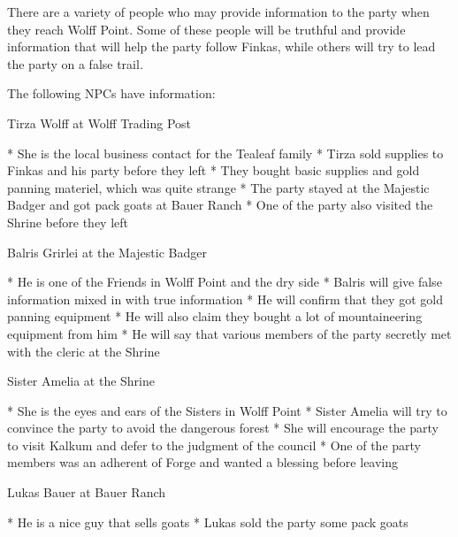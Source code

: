 There are a variety of people who may provide information to the party when they reach Wolff Point.
Some of these people will be truthful and provide information that will help the party follow Finkas, while others will try to lead the party on a false trail.

The following NPCs have information:

Tirza Wolff at Wolff Trading Post

* She is the local business contact for the Tealeaf family
* Tirza sold supplies to Finkas and his party before they left
* They bought basic supplies and gold panning materiel, which was quite strange
* The party stayed at the Majestic Badger and got pack goats at Bauer Ranch
* One of the party also visited the Shrine before they left

Balris Grirlei at the Majestic Badger

* He is one of the Friends in Wolff Point and the dry side
* Balris will give false information mixed in with true information
* He will confirm that they got gold panning equipment
* He will also claim they bought a lot of mountaineering equipment from him
* He will say that various members of the party secretly met with the cleric at the Shrine

Sister Amelia at the Shrine

* She is the eyes and ears of the Sisters in Wolff Point
* Sister Amelia will try to convince the party to avoid the dangerous forest
* She will encourage the party to visit Kalkum and defer to the judgment of the council
* One of the party members was an adherent of Forge and wanted a blessing before leaving

Lukas Bauer at Bauer Ranch

* He is a nice guy that sells goats
* Lukas sold the party some pack goats

